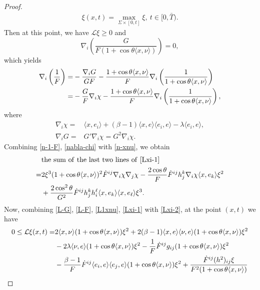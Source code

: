\documentclass[10pt,a4paper]{amsart}
\begin{document}
\begin{proof}
\begin{align*}
	\xi(x,t)=\max_{\Sigma\times[0,t]}\xi, \ t\in[0,\bar{T}).
\end{align*} 
Then at this  point, we have $\mathcal{L}\xi\geq 0$ and
\begin{equation*}
	\nabla_i\left(\frac{G}{F(1+\cos\theta\langle x,\nu \rangle)}\right)=0,
\end{equation*}
which yields
\begin{align}
	\nabla_i\left(\frac{1}{F}\right)=&-\frac{\nabla_i G}{GF}-\frac{1+\cos\theta\langle x,\nu \rangle}{F}\nabla_i\left(\frac{1}{1+\cos\theta\langle x,\nu \rangle}\right)\notag\\
	=&-\frac{G}{F}\nabla_i{\chi}-\frac{1+\cos\theta\langle x,\nu \rangle}{F}\nabla_i\left(\frac{1}{1+\cos\theta\langle x,\nu \rangle}\right),\label{n-1-F}
\end{align}
where 
\begin{align}
	\nabla_i{\chi}=&\langle x,e_i\rangle+(\beta-1)\langle x,e\rangle \langle e_i,e\rangle-\lambda \langle e_i,e\rangle,\label{nabla-chi}\\
	\nabla_i G=&G'\nabla_i\chi=G^2\nabla_i\chi.\label{nabla-G}
\end{align}
Combining \eqref{n-1-F}, \eqref{nabla-chi} with \eqref{n-xnu}, we obtain
\begin{align}
	&\mathrm{the\,\,sum \,\,of\,\, the\,\, last\,\, two \,\,lines\,\, of\,\,\eqref{Lxi-1}}\nonumber\\
 =&2\xi^3(1+\cos\theta\langle x,\nu \rangle)^2\dot{F}^{ij}\nabla_i\chi \nabla_j \chi-\frac{2\cos\theta}{F}\dot{F}^{ij}h_j^k\nabla_i{\chi}\langle x,e_k\rangle\xi^2\notag\\
	&+\frac{2\cos^2\theta}{G^2}\dot{F}^{ij}h_j^k h_i^{\ell}\langle x,e_k\rangle\langle x,e_{\ell}\rangle\xi^3.\label{Lxi-2}
\end{align}
Now, combining \eqref{L-G}, \eqref{L-F}, \eqref{L1xnu}, \eqref{Lxi-1} with \eqref{Lxi-2}, at the point $(x,t)$ we have
\begin{align}
	0\leq\mathcal{L}{\xi}(x,t)=&2\langle x,\nu\rangle(1+\cos\theta\langle x,\nu \rangle)\xi^2+2(\beta-1)\langle x,e\rangle\langle\nu,e \rangle(1+\cos\theta\langle x,\nu \rangle)\xi^2\notag\\
	&-2\lambda\langle\nu,e \rangle(1+\cos\theta\langle x,\nu \rangle)\xi^2-\frac{1}{F}\dot{F}^{ij}g_{ij}(1+\cos\theta\langle x,\nu \rangle)\xi^2\notag\\
	&-\frac{\beta-1}{F}\dot{F}^{ij}\langle e_i,e\rangle \langle e_j,e\rangle(1+\cos\theta\langle x,\nu \rangle)\xi^2+\frac{\dot{F}^{ij}(h^2)_{ij}\xi}{F^2(1+\cos\theta\langle x,\nu \rangle)}\notag\\

\end{align}
\end{proof}
\end{document}
